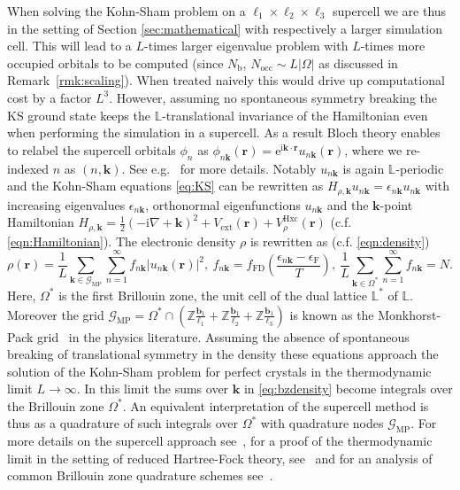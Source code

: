 \documentclass[hidelinks,onefignum,onetabnum]{siamart250211}
\newcommand{\e}{\mathrm{e}}
\newcommand{\im}{\mathrm{i}}
\renewcommand{\vec}{\bm}
\newcommand{\Nocc}{N_{\mathrm{occ}}}
\newcommand{\Vext}{V_{\mathrm{ext}}} %
\newcommand{\VHxc}{V^{\text{Hxc}}} %
\newcommand{\fFD}{f_{\mathrm{FD}}}
\newcommand{\epsilonF}{\epsilon_{\mathrm{F}}}
\newcommand{\La}{\mathbb{L}}
\newcommand{\Nb}{N_{\mathrm{b}}}
\newcommand{\mpgrid}{\mathcal{G}_\text{MP}}
\begin{document}
When solving the Kohn-Sham problem on a $\ell_1 \times \ell_2 \times \ell_3$ supercell
we are thus in the setting of Section \ref{sec:mathematical} with respectively
a larger simulation cell.
This will lead to a $L$-times larger eigenvalue problem with $L$-times
more occupied orbitals to be computed
(since $\Nb$, $\Nocc \sim L |\Omega|$ as discussed in Remark~\ref{rmk:scaling}).
When treated naively this would drive up computational cost by a factor $L^3$.
However, assuming no spontaneous symmetry breaking
the KS ground state keeps the $\La$-translational invariance of the Hamiltonian
even when performing the simulation in a supercell.
As a result Bloch theory enables to relabel the supercell orbitals $\phi_n$ as
$\phi_{n\bm k} (\bm r) = \e^{\im \bm k \cdot \bm r} u_{n \bm k}(\bm r)$,
where we re-indexed $n$ as $(n, \bm k)$.
See e.g.~\cite[Section XIII.16]{reed1978methods4} for more details.
Notably  $u_{n \bm k}$ is again $\La$-periodic and the
Kohn-Sham equations \eqref{eq:KS} can be rewritten as
\mbox{$H_{\rho,\bm k} u_{n\bm k} = \epsilon_{n\bm k} u_{n\bm k}$} with
increasing eigenvalues $\epsilon_{n\bm k}$,
orthonormal eigenfunctions $u_{n\bm k}$
%
%
%
%
and the $\bm k$-point Hamiltonian 
$H_{\rho,\bm k} = \frac{1}{2}(-\im \nabla + \bm k)^2 + \Vext(\vec{r}) + \VHxc_\rho(\vec{r})$
(c.f. \eqref{eqn:Hamiltonian}).
The electronic density $\rho$ is rewritten as (c.f. \eqref{eqn:density})
\begin{equation}
    \label{eq:bzdensity}
    \rho(\bm r) = \dfrac{1}{L} \sum_{\bm k \in \mpgrid} \sum_{n=1}^{\infty} f_{n \bm k} |u_{n\bm k}(\bm r)|^2, \ f_{n\bm k} = \fFD\left(\dfrac{\epsilon_{n\bm k} - \epsilonF}{T}\right), \ \dfrac{1}{L}\sum_{\bm k \in \Omega^*}\sum_{n=1}^{\infty} f_{n\bm k} = N.
\end{equation}
Here, $\Omega^*$ is the first Brillouin zone, the unit cell of the dual lattice $\La^*$ of $\La$.
Moreover the grid $\mpgrid = \Omega^* \cap \left(
    \mathbb{Z}\frac{\mathbf{b}_1}{\ell_1} + \mathbb{Z}\frac{\mathbf{b}_1}{\ell_2} + \mathbb{Z}\frac{\mathbf{b}_1}{\ell_3}
\right)$ is known as the Monkhorst-Pack grid~\cite{monkhorst1976special} in the physics literature.
%
Assuming the absence of spontaneous breaking of translational symmetry in the density
these equations approach the solution of the Kohn-Sham problem for perfect crystals
in the thermodynamic limit $L \to \infty$.
In this limit the sums over $\bm k$ in \eqref{eq:bzdensity} become integrals over the Brillouin zone $\Omega^*$.
An equivalent interpretation of the supercell method is thus as a quadrature of
such integrals over $\Omega^*$ with quadrature nodes $\mpgrid$.
For more details on the supercell approach see~\cite[Section 2.8]{lin2019math_electronic},
for a proof of the thermodynamic limit in the setting of reduced Hartree-Fock theory,
see~\cite{cances2008localdefects,catto1998mathematical,gontier2016convergencerhf}
and for an analysis of common Brillouin zone quadrature schemes see~\cite{cances2020quadratureBZ}.
\end{document}
